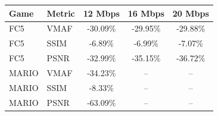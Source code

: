 \begin{tabular}{llccc}
\toprule
Game & Metric & 12 Mbps & 16 Mbps & 20 Mbps \\
\midrule
FC5 & VMAF & -30.09\% & -29.95\% & -29.88\% \\
FC5 & SSIM & -6.89\% & -6.99\% & -7.07\% \\
FC5 & PSNR & -32.99\% & -35.15\% & -36.72\% \\
\midrule
MARIO & VMAF & -34.23\% & -- & -- \\
MARIO & SSIM & -8.33\% & -- & -- \\
MARIO & PSNR & -63.09\% & -- & -- \\
\bottomrule
\end{tabular}
